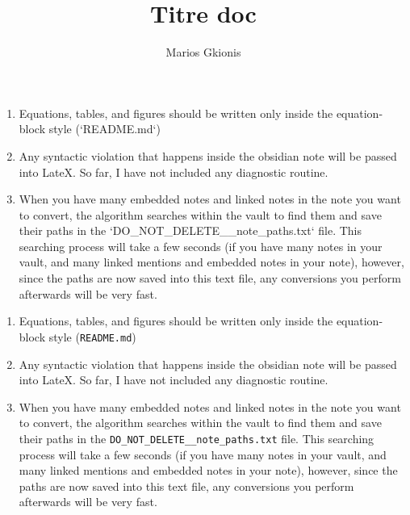 \documentclass{extarticle}
\begin{document}
\allowdisplaybreaks
\date{}
\author{Marios Gkionis}
\title{Titre doc}
\maketitle

\begin{enumerate}

\item Equations, tables, and figures should be written only inside the equation-block style (`README.md`)

\item Any syntactic violation that happens inside the obsidian note will be passed into LateX. So far, I have not included any diagnostic routine.

\item When you have many embedded notes and linked notes in the note you want to convert, the algorithm searches within the vault to find them and save their paths in the `DO_NOT_DELETE__note_paths.txt` file. This searching process will take a few seconds (if you have many notes in your vault, and many linked mentions and embedded notes in your note), however, since the paths are now saved into this text file, any conversions you perform afterwards will be very fast.

\end{enumerate}

\tableofcontents
\newpage


\begin{enumerate}

\item Equations, tables, and figures should be written only inside the equation-block style (\texttt{README.md})

\item Any syntactic violation that happens inside the obsidian note will be passed into LateX. So far, I have not included any diagnostic routine.

\item When you have many embedded notes and linked notes in the note you want to convert, the algorithm searches within the vault to find them and save their paths in the \texttt{DO\_NOT\_DELETE\_\_note\_paths.txt} file. This searching process will take a few seconds (if you have many notes in your vault, and many linked mentions and embedded notes in your note), however, since the paths are now saved into this text file, any conversions you perform afterwards will be very fast.

\end{enumerate}
\end{document}
